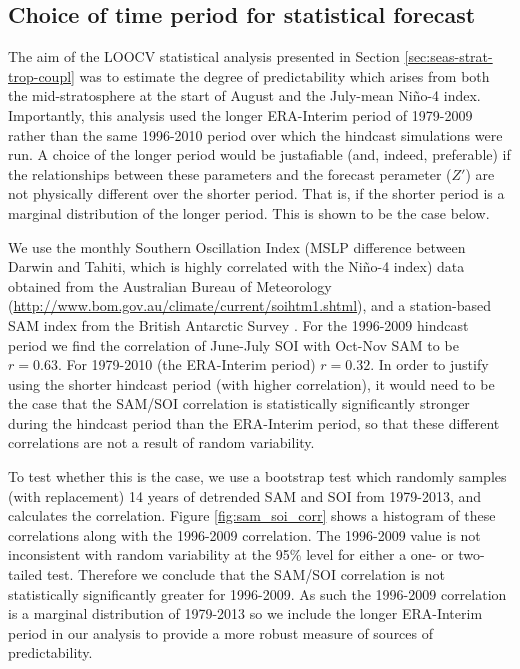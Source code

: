 \begin{subappendices}
\section{Choice of time period for statistical forecast}
\label{sec:app-choice-time-period}

The aim of the LOOCV statistical analysis presented in Section
\ref{sec:seas-strat-trop-coupl} was to estimate the degree of predictability
which arises from both the mid-stratosphere at the start of August and the
July-mean Ni\~no-4 index. Importantly, this analysis used the longer ERA-Interim
period of 1979-2009 rather than the same 1996-2010 period over which the
hindcast simulations were run. A choice of the longer period would be
justafiable (and, indeed, preferable) if the relationships between these
parameters and the forecast perameter ($Z'$) are not physically different over
the shorter period. That is, if the shorter period is a marginal distribution of
the longer period. This is shown to be the case below.

We use the monthly Southern Oscillation Index (MSLP difference between Darwin
and Tahiti, which is highly correlated with the Ni\~no-4 index) data obtained
from the Australian Bureau of Meteorology
(\url{http://www.bom.gov.au/climate/current/soihtm1.shtml}), and a station-based
SAM index from the British Antarctic Survey \citep{Marshall2003}. For the
1996-2009 hindcast period we find the correlation of June-July SOI with Oct-Nov
SAM to be $r=0.63$. For 1979-2010 (the ERA-Interim period) $r=0.32$. In order to
justify using the shorter hindcast period (with higher correlation), it would
need to be the case that the SAM/SOI correlation is statistically significantly
stronger during the hindcast period than the ERA-Interim period, so that these
different correlations are not a result of random variability.

To test whether this is the case, we use a bootstrap test which randomly samples
(with replacement) 14 years of detrended SAM and SOI from 1979-2013, and
calculates the correlation. Figure \ref{fig:sam_soi_corr} shows a histogram of
these correlations along with the 1996-2009 correlation. The 1996-2009 value is
not inconsistent with random variability at the 95\% level for either a one- or
two-tailed test. Therefore we conclude that the SAM/SOI correlation is not
statistically significantly greater for 1996-2009. As such the 1996-2009
correlation is a marginal distribution of 1979-2013 so we include the longer
ERA-Interim period in our analysis to provide a more robust measure of sources
of predictability. 


\end{subappendices}
